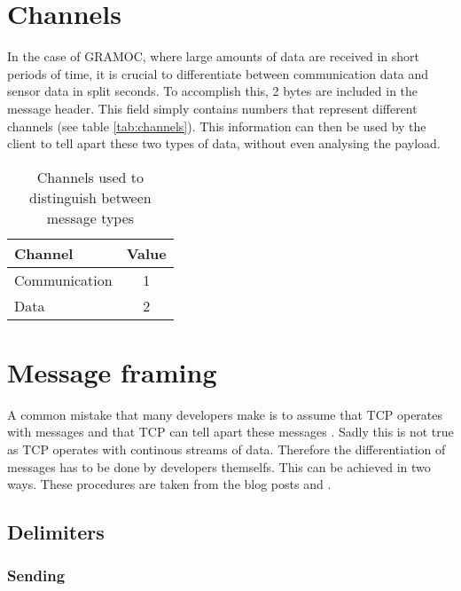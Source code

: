 \section{Channels}
\label{sec:channels}

In the case of GRAMOC, where large amounts of data are received in short periods of time, it is crucial to differentiate between communication data and sensor data in split seconds. To accomplish this, 2 bytes are included in the message header. This field simply contains numbers that represent different channels (see table \vref{tab:channels}). This information can then be used by the client to tell apart these two types of data, without even analysing the payload.

\begin{table}[h]
    \centering
    \begin{tabular}{| l | c |}
    \hline
    \textbf{Channel} & \textbf{Value} \\ \hline
    Communication & 1 \\ \hline
    Data & 2 \\
    \hline
    \end{tabular}
    \caption{Channels used to distinguish between message types}
    \label{tab:channels}
\end{table}

\section{Message framing}
\label{sec:messageframing}

A common mistake that many developers make is to assume that TCP operates with messages and that TCP can tell apart these messages \autocite{MessageFramingCleary, MessageFramingSkotzko}. Sadly this is not true as TCP operates with continous streams of data. Therefore the differentiation of messages has to be done by developers themselfs. This can be achieved in two ways. These procedures are taken from the blog posts  and  \autocite{MessageFramingCleary, MessageFramingSkotzko}.

\subsection{Delimiters}

\subsubsection{Sending}

